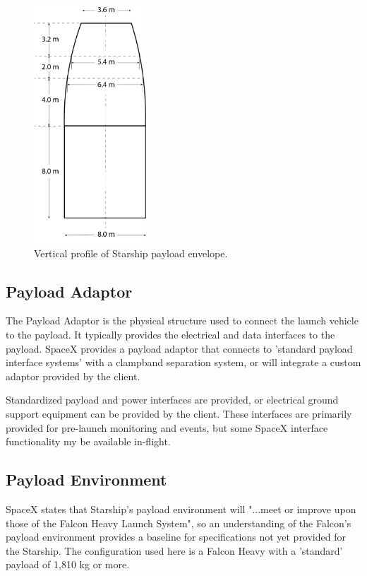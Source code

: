 \documentclass[11pt]{article}
\begin{document}
\begin{figure}[!b]
    \centering
    \includegraphics[height=3.5in]{assets/PayloadProfile.png}
    \caption{Vertical profile of Starship payload envelope.}
    \label{fig:StarshipPayload}
\end{figure}
\subsection{Payload Adaptor}

The Payload Adaptor is the physical structure used to connect the launch vehicle to the payload. It typically provides the electrical and data interfaces to the payload. SpaceX provides a payload adaptor that connects to 'standard payload interface systems' with a clampband separation system, or will integrate a custom adaptor provided by the client.

Standardized payload and power interfaces are provided, or electrical ground support equipment can be provided by the client. These interfaces are primarily provided for pre-launch monitoring and events, but some SpaceX interface functionality my be available in-flight.\cite{spacex01}

\subsection{Payload Environment}
SpaceX states that Starship's payload environment will "...meet or improve upon those of the Falcon Heavy Launch System", so an understanding of the Falcon's payload environment provides a baseline for specifications not yet provided for the Starship. The configuration used here is a Falcon Heavy with a 'standard' payload of 1,810 kg or more.
\end{document}
